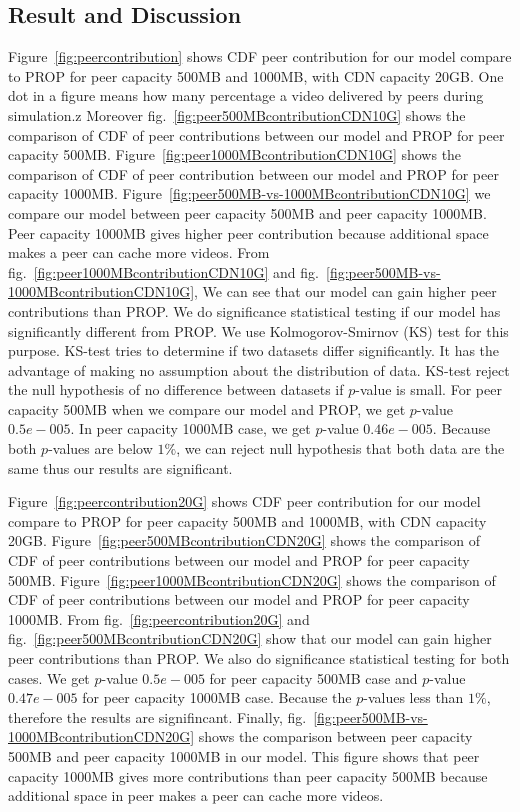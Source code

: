 \documentclass[10pt,final,journal,a4paper]{IEEEtran}
\begin{document}
\subsection{Result and Discussion}\label{resultanddiscussion}

Figure~\ref{fig:peercontribution} shows CDF peer contribution for our model compare to PROP for peer capacity 500MB and 1000MB, with CDN capacity 20GB. 
One dot in a figure means how many percentage a video delivered by peers during simulation.z
Moreover fig.~\ref{fig:peer500MBcontributionCDN10G} shows the comparison of CDF of peer contributions between our model and PROP for peer capacity 500MB. 
Figure~\ref{fig:peer1000MBcontributionCDN10G} shows the comparison of CDF of peer contribution between our model and PROP for peer capacity 1000MB.
Figure~\ref{fig:peer500MB-vs-1000MBcontributionCDN10G} we compare our model between peer capacity 500MB and peer capacity 1000MB.
Peer capacity 1000MB gives higher peer contribution because additional space makes a peer can cache more videos.
From fig.~\ref{fig:peer1000MBcontributionCDN10G} and fig.~\ref{fig:peer500MB-vs-1000MBcontributionCDN10G}, We can see that our model can gain higher peer contributions than PROP.
We do significance statistical testing if our model has significantly different from PROP.
We use Kolmogorov-Smirnov (KS) test for this purpose.  
KS-test tries to determine if two datasets differ significantly.
It has the advantage of making no assumption about the distribution of data. 
KS-test reject the null hypothesis of no difference between datasets if $p$-value is small.
For peer capacity 500MB when we compare our model and PROP, we get $p$-value $0.5e-005$.
In peer capacity 1000MB case, we get $p$-value $0.46e-005$.
Because both $p$-values are below $1\%$, we can reject null hypothesis that both data are the same thus our results are significant.


Figure~\ref{fig:peercontribution20G} shows CDF peer contribution for our model compare to PROP for peer capacity 500MB and 1000MB, with CDN capacity 20GB.
Figure~\ref{fig:peer500MBcontributionCDN20G} shows the comparison of CDF of peer contributions between our model and PROP for peer capacity 500MB.
Figure~\ref{fig:peer1000MBcontributionCDN20G} shows the comparison of CDF of peer contributions between our model and PROP for peer capacity 1000MB.
From fig.~\ref{fig:peercontribution20G} and fig.~\ref{fig:peer500MBcontributionCDN20G} show that our model can gain higher peer contributions than PROP.
We also do significance statistical testing for both cases.  
We get $p$-value $0.5e-005$ for peer capacity 500MB case and $p$-value $0.47e-005$ for peer capacity 1000MB case.
Because the $p$-values less than $1\%$, therefore the results are signifincant.
Finally, fig.~\ref{fig:peer500MB-vs-1000MBcontributionCDN20G} shows the comparison between peer capacity 500MB and peer capacity 1000MB in our model. 
This figure shows that peer capacity 1000MB gives more contributions than peer capacity 500MB because additional space in peer makes a peer can cache more videos.  
\end{document}
